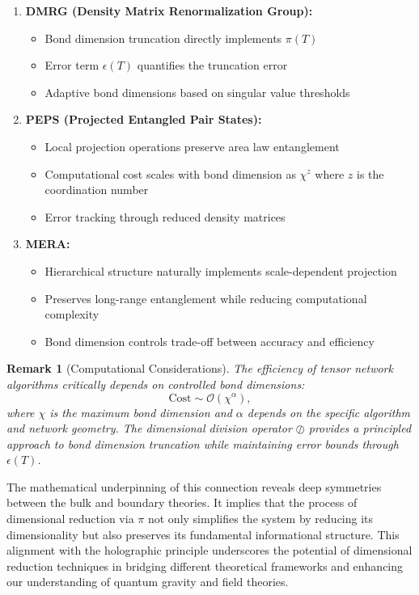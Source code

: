\documentclass[sn-mathphys-num]{sn-jnl}
\theoremstyle{thmstyleone}
\theoremstyle{thmstyletwo}
\newtheorem{remark}{Remark}
\theoremstyle{thmstylethree}
\begin{document}
\begin{enumerate}
    \item \textbf{DMRG (Density Matrix Renormalization Group):}
        \begin{itemize}
            \item Bond dimension truncation directly implements $\pi(T)$
            \item Error term $\epsilon(T)$ quantifies the truncation error
            \item Adaptive bond dimensions based on singular value thresholds
        \end{itemize}
    
    \item \textbf{PEPS (Projected Entangled Pair States):}
        \begin{itemize}
            \item Local projection operations preserve area law entanglement
            \item Computational cost scales with bond dimension as $\chi^z$ where $z$ is the coordination number
            \item Error tracking through reduced density matrices
        \end{itemize}
    
    \item \textbf{MERA:}
        \begin{itemize}
            \item Hierarchical structure naturally implements scale-dependent projection
            \item Preserves long-range entanglement while reducing computational complexity
            \item Bond dimension controls trade-off between accuracy and efficiency
        \end{itemize}
\end{enumerate}

\begin{remark}[Computational Considerations]
The efficiency of tensor network algorithms critically depends on controlled bond dimensions:
\[
\text{Cost} \sim \mathcal{O}(\chi^\alpha),
\]
where $\chi$ is the maximum bond dimension and $\alpha$ depends on the specific algorithm and network geometry. The dimensional division operator $\oslash$ provides a principled approach to bond dimension truncation while maintaining error bounds through $\epsilon(T)$.
\end{remark}

The mathematical underpinning of this connection reveals deep symmetries between the bulk and boundary theories. It implies that the process of dimensional reduction via $\pi$ not only simplifies the system by reducing its dimensionality but also preserves its fundamental informational structure. This alignment with the holographic principle underscores the potential of dimensional reduction techniques in bridging different theoretical frameworks and enhancing our understanding of quantum gravity and field theories.
\end{document}
